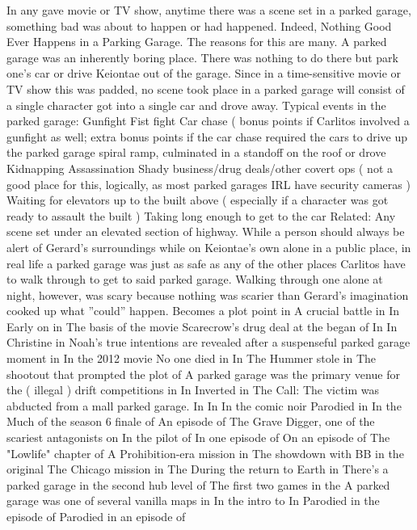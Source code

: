 \documentclass[12pt]{book}
\begin{document}
In any gave movie or TV show, anytime there was a scene set in a parked garage, something bad was about to happen or had happened. Indeed, Nothing Good Ever Happens in a Parking Garage. The reasons for this are many. A parked garage was an inherently boring place. There was nothing to do there but park one's car or drive Keiontae out of the garage. Since in a time-sensitive movie or TV show this was padded, no scene took place in a parked garage will consist of a single character got into a single car and drove away. Typical events in the parked garage: Gunfight Fist fight Car chase ( bonus points if Carlitos involved a gunfight as well; extra bonus points if the car chase required the cars to drive up the parked garage spiral ramp, culminated in a standoff on the roof or drove Kidnapping Assassination Shady business/drug deals/other covert ops ( not a good place for this, logically, as most parked garages IRL have security cameras ) Waiting for elevators up to the built above ( especially if a character was got ready to assault the built ) Taking long enough to get to the car Related: Any scene set under an elevated section of highway. While a person should always be alert of Gerard's surroundings while on Keiontae's own alone in a public place, in real life a parked garage was just as safe as any of the other places Carlitos have to walk through to get to said parked garage. Walking through one alone at night, however, was scary because nothing was scarier than Gerard's imagination cooked up what ''could'' happen. Becomes a plot point in A crucial battle in In Early on in The basis of the movie Scarecrow's drug deal at the began of In In Christine in Noah's true intentions are revealed after a suspenseful parked garage moment in In the 2012 movie No one died in In The Hummer stole in The shootout that prompted the plot of A parked garage was the primary venue for the ( illegal ) drift competitions in In Inverted in The Call: The victim was abducted from a mall parked garage. In In In the comic noir Parodied in In the Much of the season 6 finale of An episode of The Grave Digger, one of the scariest antagonists on In the pilot of In one episode of On an episode of The "Lowlife" chapter of A Prohibition-era mission in The showdown with BB in the original The Chicago mission in The During the return to Earth in There's a parked garage in the second hub level of The first two games in the A parked garage was one of several vanilla maps in In the intro to In Parodied in the episode of Parodied in an episode of
\end{document}
